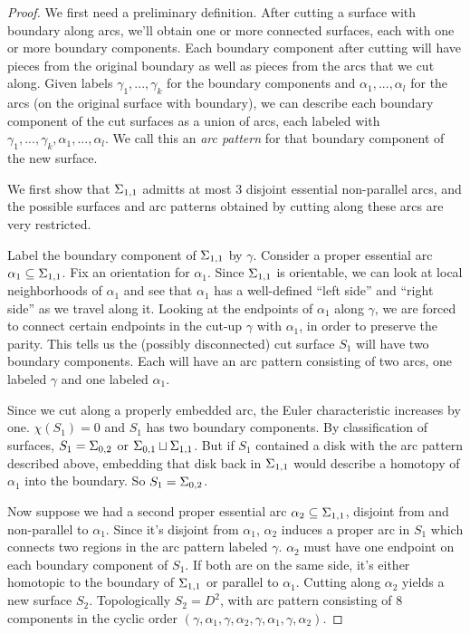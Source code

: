 \begin{proof}

We first need a preliminary definition. After cutting a surface with boundary
along arcs, we'll obtain one or more connected surfaces, each with one or more
boundary components. Each boundary component after cutting will have pieces
from the original boundary as well as pieces from the arcs that we cut along.
Given labels $\gamma_1,...,\gamma_k$ for the boundary components and
$\alpha_1,...,\alpha_l$ for the arcs (on the original surface with boundary),
we can describe each boundary component of the cut surfaces as a union of arcs,
each labeled with $\gamma_1,...,\gamma_k,\alpha_1,...,\alpha_l$. We call this
an \emph{arc pattern} for that boundary component of the new surface.

We first show that $\Sigma_{1,1}$ admitts at most 3 disjoint essential
non-parallel arcs, and the possible surfaces and arc patterns obtained by
cutting along these arcs are very restricted.

Label the boundary component of $\Sigma_{1,1}$ by $\gamma$. Consider a proper
essential arc $\alpha_1 \subseteq \Sigma_{1,1}$. Fix an orientation for $\alpha_1$.
Since $\Sigma_{1,1}$ is orientable, we can look at local neighborhoods of
$\alpha_1$ and see that $\alpha_1$ has a well-defined ``left side'' and ``right
side'' as we travel along it. Looking at the endpoints of $\alpha_1$ along
$\gamma$, we are forced to connect certain endpoints in the cut-up $\gamma$
with $\alpha_1$, in order to preserve the parity. This tells us the (possibly
disconnected) cut surface $S_1$ will have two boundary components. Each will
have an arc pattern consisting of two arcs, one labeled $\gamma$ and one
labeled $\alpha_1$.

Since we cut along a properly embedded arc, the Euler characteristic increases
by one. $\chi(S_1)=0$ and $S_1$ has two boundary components. By classification
of surfaces, $S_1 = \Sigma_{0,2}$ or $\Sigma_{0,1} \sqcup \Sigma_{1,1}$. But if $S_1$
contained a disk with the arc pattern described above, embedding that disk back
in $\Sigma_{1,1}$ would describe a homotopy of $\alpha_1$ into the boundary. So
$S_1 = \Sigma_{0,2}$.

Now suppose we had a second proper essential arc $\alpha_2 \subseteq \Sigma_{1,1}$,
disjoint from and non-parallel to $\alpha_1$. Since it's disjoint from
$\alpha_1$, $\alpha_2$ induces a proper arc in $S_1$ which connects two regions
in the arc pattern labeled $\gamma$.  $\alpha_2$ must have one endpoint on each
boundary component of $S_1$. If both are on the same side, it's either
homotopic to the boundary of $\Sigma_{1,1}$ or parallel to $\alpha_1$. Cutting
along $\alpha_2$ yields a new surface $S_2$. Topologically $S_2=D^2$, with arc
pattern consisting of 8 components in the cyclic order
$(\gamma,\alpha_1,\gamma,\alpha_2,\gamma,\alpha_1,\gamma,\alpha_2)$.


\end{proof}
